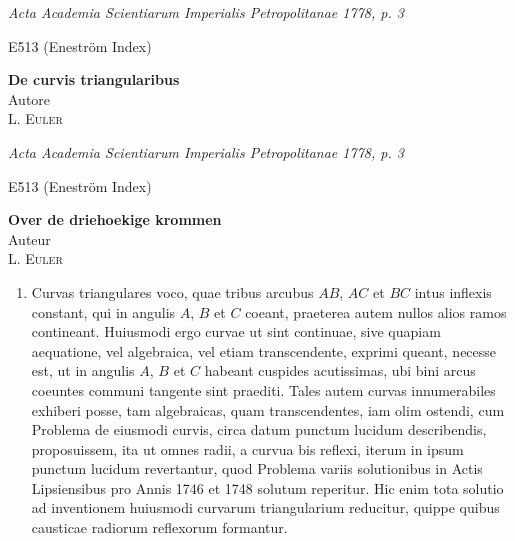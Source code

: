 \documentclass[10pt,a4paper]{article}
\begin{document}
	
	\begin{paracol}{2}		
	\par \textit{Acta Academia Scientiarum Imperialis Petropolitanae 1778, p. 3}
	\par E513 (Eneström Index) 
	\begin{center}
		\par {}
		
		\par {\bf De curvis triangularibus}\\
		Autore\\
		\textsc{L. Euler}
	\end{center}
	\switchcolumn
	
	\par \textit{Acta Academia Scientiarum Imperialis Petropolitanae 1778, p. 3} 
	\par E513 (Eneström Index) 
	\begin{center}
		\par {}
		
		\par {\bf Over de driehoekige krommen}\\
		Auteur\\
		\textsc{L. Euler}
	\end{center}
	\switchcolumn*

	\par \begin{enumerate}[topsep=1px]
		\item Curvas triangulares voco, quae tribus arcubus $AB$, $AC$ et $BC$ intus inflexis constant, qui in angulis $A$, $B$ et $C$ coeant, praeterea autem nullos alios ramos contineant. Huiusmodi ergo curvae ut sint continuae, sive quapiam aequatione, vel algebraica, vel etiam transcendente, exprimi queant, necesse est, ut in angulis $A$, $B$ et $C$ habeant cuspides acutissimas, ubi bini arcus coeuntes communi tangente sint praediti. Tales autem curvas innumerabiles exhiberi posse, tam algebraicas, quam transcendentes, iam olim ostendi, cum Problema de eiusmodi curvis, circa datum punctum lucidum describendis, proposuissem, ita ut omnes radii, a curvua bis reflexi, iterum in ipsum punctum lucidum revertantur, quod Problema variis solutionibus in Actis Lipsiensibus pro Annis 1746 et 1748 solutum reperitur. Hic enim tota solutio ad inventionem huiusmodi curvarum triangularium reducitur, quippe quibus causticae radiorum reflexorum formantur. 
			

\end{enumerate}
\end{paracol}
\end{document}
